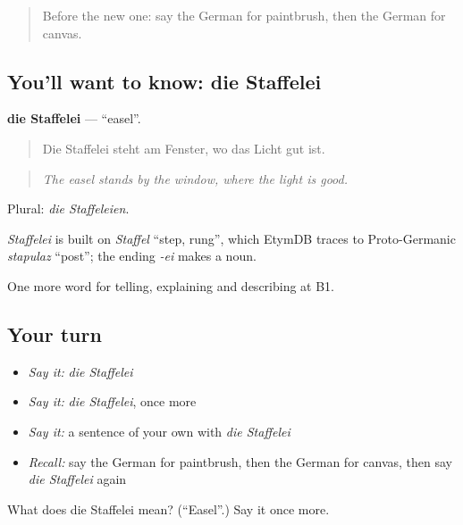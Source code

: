 \begin{quote}
Before the new one: say the German for paintbrush, then the German for canvas.
\end{quote}

\subsection*{You'll want to know: die Staffelei}
\textbf{die Staffelei} — \textquotedblleft{}easel\textquotedblright{}.

\begin{quote}
Die Staffelei steht am Fenster, wo das Licht gut ist.
\end{quote}

\begin{quote}
\emph{The easel stands by the window, where the light is good.}
\end{quote}

Plural: \emph{die Staffeleien}.

\begin{cousinweb}
\emph{Staffelei} is built on \emph{Staffel} \textquotedblleft{}step, rung\textquotedblright{}, which EtymDB traces to Proto-Germanic \emph{stapulaz} \textquotedblleft{}post\textquotedblright{}; the ending \emph{-ei} makes a noun.
\end{cousinweb}

\begin{grammarlens}[title={What you've built}]
One more word for telling, explaining and describing at B1.
\end{grammarlens}

\subsection*{Your turn}
\begin{itemize}
\raggedright
  \item \emph{Say it:} \emph{die Staffelei}
  \item \emph{Say it:} \emph{die Staffelei}, once more
  \item \emph{Say it:} a sentence of your own with \emph{die Staffelei}
  \item \emph{Recall:} say the German for paintbrush, then the German for canvas, then say \emph{die Staffelei} again
\end{itemize}

\begin{tcolorbox}[breakable,colback=teal!4,colframe=teal!35!black,title={Before you move on}]
What does die Staffelei mean? (\textquotedblleft{}Easel\textquotedblright{}.) Say it once more.
\end{tcolorbox}
